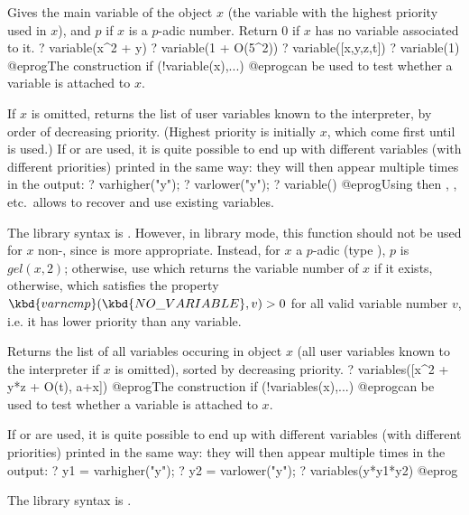\label{se:variable}
Gives the main variable of the object $x$ (the variable with the highest
priority used in $x$), and $p$ if $x$ is a $p$-adic number. Return $0$ if
$x$ has no variable associated to it.
\bprog
? variable(x^2 + y)
? variable(1 + O(5^2))
? variable([x,y,z,t])
? variable(1)
@eprog\noindent The construction
\bprog
   if (!variable(x),...)
@eprog\noindent can be used to test whether a variable is attached to $x$.

If $x$ is omitted, returns the list of user variables known to the
interpreter, by order of decreasing priority. (Highest priority is initially
$x$, which come first until  is used.) If 
or  are used, it is quite possible to end up with different
variables (with different priorities) printed in the same way: they
will then appear multiple times in the output:
\bprog
? varhigher("y");
? varlower("y");
? variable()
@eprog\noindent Using  then , ,
etc.~allows to recover and use existing variables.

The library syntax is .
However, in library mode, this function should not be used for $x$
non-, since  is more appropriate. Instead, for
$x$ a $p$-adic (type ), $p$ is $gel(x,2)$; otherwise, use
 which returns the variable number of $x$ if
it exists,  otherwise, which satisfies the property
$\kbd{varncmp}(\kbd{NO\_VARIABLE}, v) > 0$ for all valid variable number
$v$, i.e. it has lower priority than any variable.

\label{se:variables}
Returns the list of all variables occuring in object $x$ (all user
variables known to the interpreter if $x$ is omitted), sorted by
decreasing priority.
\bprog
? variables([x^2 + y*z + O(t), a+x])
@eprog\noindent The construction
\bprog
   if (!variables(x),...)
@eprog\noindent can be used to test whether a variable is attached to $x$.

If  or  are used, it is quite possible to end up
with different variables (with different priorities) printed in the same
way: they will then appear multiple times in the output:
\bprog
? y1 = varhigher("y");
? y2 = varlower("y");
? variables(y*y1*y2)
@eprog

The library syntax is .

